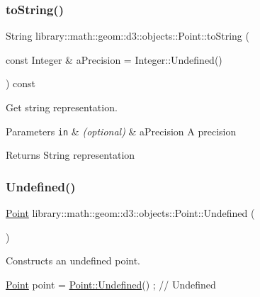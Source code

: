 \subsubsection{\texorpdfstring{to\+String()}{toString()}}
{\footnotesize\ttfamily String library\+::math\+::geom\+::d3\+::objects\+::\+Point\+::to\+String (\begin{DoxyParamCaption}\item[{const Integer \&}]{a\+Precision = {\ttfamily Integer\+:\+:Undefined()} }\end{DoxyParamCaption}) const}



Get string representation. 


\begin{DoxyParams}[1]{Parameters}
\mbox{\tt in}  & {\em (optional)} & a\+Precision A precision \\
\hline
\end{DoxyParams}
\begin{DoxyReturn}{Returns}
String representation 
\end{DoxyReturn}
\mbox{\label{classlibrary_1_1math_1_1geom_1_1d3_1_1objects_1_1_point_a7c4c9c71f9b29b85925d8a7ed4943501}} 
\subsubsection{\texorpdfstring{Undefined()}{Undefined()}}
{\footnotesize\ttfamily \hyperlink{classlibrary_1_1math_1_1geom_1_1d3_1_1objects_1_1_point}{Point} library\+::math\+::geom\+::d3\+::objects\+::\+Point\+::\+Undefined (\begin{DoxyParamCaption}{ }\end{DoxyParamCaption})\hspace{0.3cm}{\ttfamily [static]}}



Constructs an undefined point. 


\begin{DoxyCode}
\hyperlink{classlibrary_1_1math_1_1geom_1_1d3_1_1objects_1_1_point_a617e690ab6091af3de729cee337e309e}{Point} point = \hyperlink{classlibrary_1_1math_1_1geom_1_1d3_1_1objects_1_1_point_a7c4c9c71f9b29b85925d8a7ed4943501}{Point::Undefined}() ; \textcolor{comment}{// Undefined}
\end{DoxyCode}


